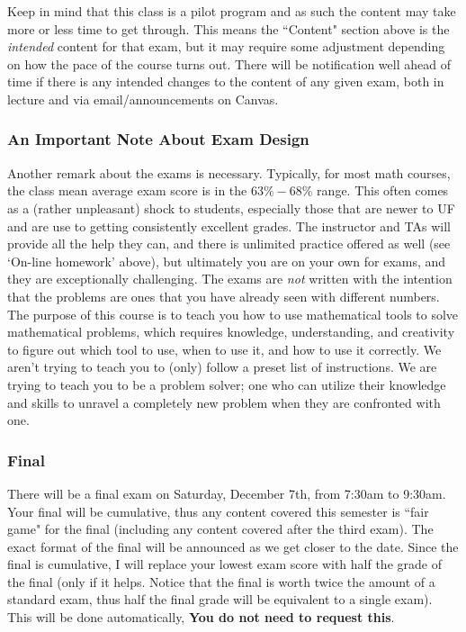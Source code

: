 \documentclass{ximeraXloud}
\begin{document}
    Keep in mind that this class is a pilot program and as such the content may take more or less time to get through. This means the ``Content" section above is the \textit{intended} content for that exam, but it may require some adjustment depending on how the pace of the course turns out. There will be notification well ahead of time if there is any intended changes to the content of any given exam, both in lecture and via email/announcements on Canvas.
    
\subsubsection*{An Important Note About Exam Design}
    
    Another remark about the exams is necessary. Typically, for most math courses, the class mean average exam score is in the $63\%-68$\% range. This often comes as a (rather unpleasant) shock to students, especially those that are newer to UF and are use to getting consistently excellent grades. The instructor and TAs will provide all the help they can, and there is unlimited practice offered as well (see `On-line homework' above), but ultimately you are on your own for exams, and they are exceptionally challenging. The exams are \textit{not} written with the intention that the problems are ones that you have already seen with different numbers. The purpose of this course is to teach you how to use mathematical tools to solve mathematical problems, which requires knowledge, understanding, and creativity to figure out which tool to use, when to use it, and how to use it correctly. We aren't trying to teach you to (only) follow a preset list of instructions. We are trying to teach you to be a problem solver; one who can utilize their knowledge and skills to unravel a completely new problem when they are confronted with one.

\subsubsection*{Final}
    There will be a final exam on Saturday, December 7th, from 7:30am to 9:30am. Your final will be cumulative, thus any content covered this semester is ``fair game" for the final (including any content covered after the third exam). The exact format of the final will be announced as we get closer to the date. Since the final is cumulative, I will replace your lowest exam score with half the grade of the final (only if it helps. Notice that the final is worth twice the amount of a standard exam, thus half the final grade will be equivalent to a single exam). This will be done automatically, \textbf{You do not need to request this}. 
\end{document}
